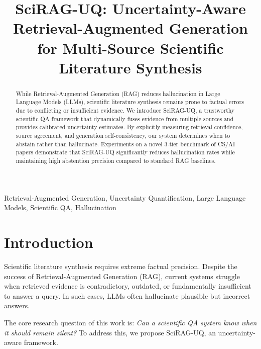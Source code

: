 \documentclass[conference]{IEEEtran}
\begin{document}
\title{SciRAG-UQ: Uncertainty-Aware Retrieval-Augmented Generation for Multi-Source Scientific Literature Synthesis}

\author{
}

\maketitle

\begin{abstract}
While Retrieval-Augmented Generation (RAG) reduces hallucination in Large Language Models (LLMs), scientific literature synthesis remains prone to factual errors due to conflicting or insufficient evidence. We introduce SciRAG-UQ, a trustworthy scientific QA framework that dynamically fuses evidence from multiple sources and provides calibrated uncertainty estimates. By explicitly measuring retrieval confidence, source agreement, and generation self-consistency, our system determines when to abstain rather than hallucinate. Experiments on a novel 3-tier benchmark of CS/AI papers demonstrate that SciRAG-UQ significantly reduces hallucination rates while maintaining high abstention precision compared to standard RAG baselines.
\end{abstract}

\begin{IEEEkeywords}
Retrieval-Augmented Generation, Uncertainty Quantification, Large Language Models, Scientific QA, Hallucination
\end{IEEEkeywords}

\section{Introduction}
Scientific literature synthesis requires extreme factual precision. Despite the success of Retrieval-Augmented Generation (RAG), current systems struggle when retrieved evidence is contradictory, outdated, or fundamentally insufficient to answer a query. In such cases, LLMs often hallucinate plausible but incorrect answers.

The core research question of this work is: \textit{Can a scientific QA system know when it should remain silent?} To address this, we propose SciRAG-UQ, an uncertainty-aware framework.
\end{document}
